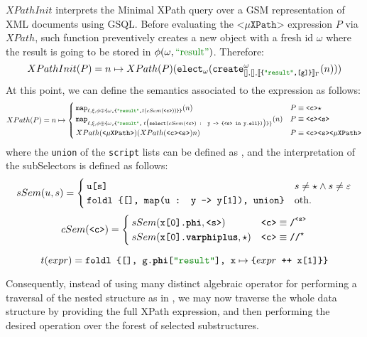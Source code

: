 \begin{definition}
 $XPathInit$ interprets the Minimal XPath query over a GSM representation of XML documents using GSQL. Before evaluating the $\texttt{<}\mu\texttt{XPath}\texttt{>}$  expression $P$ via $XPath$, such function preventively creates a new object with a fresh id $\omega$ where the result is going to be stored in $\phi(\omega,\mstr{result})$. Therefore:
\[XPathInit(P) = n\mapsto XPath(P) (\texttt{elect}_\omega(\texttt{create}^\omega_{[],[],\jsem{\texttt{\{\mstr{result},[g]\}}}_\Gamma}(n)))\]
At this point, we can define the semantics associated to the expression as follows:
\[XPath(P) = n\mapsto \begin{cases}
	\texttt{map}_{\ell,\xi,\phi\oplus \texttt{\{}\omega\texttt{,\{\mstr{result},}t(cSem(\texttt{<c>}))\texttt{\}\}} }(n) & P\equiv \texttt{<c>}\star\\
	\texttt{map}_{\ell,\xi,\phi\oplus\texttt{\{}\omega\texttt{,\{\mstr{result},}\;t\big(\texttt{select(} cSem(\texttt{<c>}) \texttt{ : y -> \{<s> in y.\textbf{ell}\})}\big)\texttt{\}}\}}(n) & P\equiv \texttt{<c>}\texttt{<s>}\\
	XPath(\texttt{<}\mu\texttt{XPath>}) (XPath(\texttt{<c><s>}) n ) & P\equiv \texttt{<c><s>}\texttt{<}\mu\texttt{XPath>}\\
\end{cases}\]
where the \texttt{union} of the \texttt{script} lists can be defined as , and the interpretation of the subSelectors is defined as follows:
\[sSem(u,s)=\begin{cases}
\texttt{u[s]} & s\neq \star\wedge s\neq \varepsilon\\
\texttt{foldl \{[], map(u : y -> y[1]), union\}} & \textup{oth.}\\
\end{cases}\]
\[cSem(\texttt{<c>})=\begin{cases}
 sSem(\texttt{x[0].\textbf{phi}},\texttt{<s>})\texttt{} & \texttt{<c>}\equiv\texttt{/}^\texttt{\texttt{<s>}}\\
 sSem(\texttt{x[0].\textbf{varphiplus}},\star)\texttt{} & \texttt{<c>}\equiv\texttt{//}^{\star}\\
\end{cases}\]

\[t(expr)=\texttt{foldl \{[], g.\textbf{phi}[\mstr{result}], x}\mapsto\texttt{\{}expr\texttt{ ++ x[1]\}\}}\]
\end{definition}

Consequently, instead of using many distinct algebraic operator for performing a traversal of the nested structure as in \cite{Magnani06}, we may now traverse the whole data structure by providing the full XPath expression, and then performing the desired operation over the forest of selected substructures.


